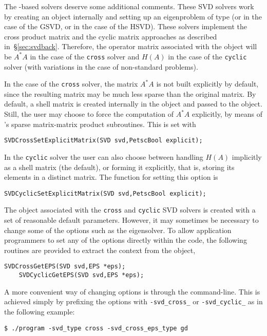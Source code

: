 The -based solvers deserve some additional comments. These SVD solvers work by creating an  object internally and setting up an eigenproblem of type  (or  in the case of the GSVD, or  in the case of the HSVD). These solvers implement the cross product matrix and the cyclic matrix approaches as described in~\S\ref{sec:svdback}. Therefore, the operator matrix associated with the  object will be $A^*A$ in the case of the \texttt{cross} solver and $H(A)$ in the case of the \texttt{cyclic} solver (with variations in the case of non-standard problems).

In the case of the \texttt{cross} solver, the matrix $A^*A$ is not built explicitly by default, since the resulting matrix may be much less sparse than the original matrix. By default, a shell matrix is created internally in the  object and passed to the  object. Still, the user may choose to force the computation of $A^*A$ explicitly, by means of \petsc's sparse matrix-matrix product subroutines. This is set with
	\begin{Verbatim}[fontsize=\small]
	SVDCrossSetExplicitMatrix(SVD svd,PetscBool explicit);
	\end{Verbatim}
In the \texttt{cyclic} solver the user can also choose between handling $H(A)$ implicitly as a shell matrix (the default), or forming it explicitly, that is, storing its elements in a distinct matrix. The function for setting this option is
	\begin{Verbatim}[fontsize=\small]
	SVDCyclicSetExplicitMatrix(SVD svd,PetscBool explicit);
	\end{Verbatim}

The  object associated with the \texttt{cross} and \texttt{cyclic} SVD solvers is created with a set of reasonable default parameters. However, it may sometimes be necessary to change some of the  options such as the eigensolver. To allow application programmers to set any of the  options directly within the code, the following routines are provided to extract the  context from the  object,
	\begin{Verbatim}[fontsize=\small]
	SVDCrossGetEPS(SVD svd,EPS *eps);
	SVDCyclicGetEPS(SVD svd,EPS *eps);
	\end{Verbatim}
A more convenient way of changing  options is through the command-line. This is achieved simply by prefixing the  options with \texttt{-svd\_cross\_} or \texttt{-svd\_cyclic\_} as in the following example:
\begin{Verbatim}[fontsize=\small]
	$ ./program -svd_type cross -svd_cross_eps_type gd
\end{Verbatim}

